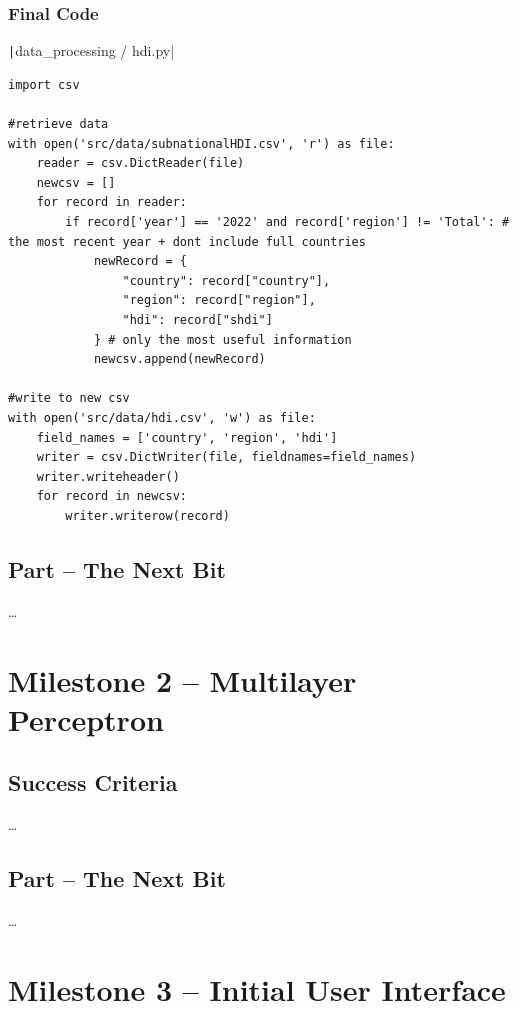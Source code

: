 \documentclass[12pt]{report}
\newcommand{\pil}[1]{\texttt|#1|}
\begin{document}
\subsubsection{Final Code}
\begin{listing}[H]
\pil{data_processing / hdi.py}
\begin{verbatim}
import csv

#retrieve data
with open('src/data/subnationalHDI.csv', 'r') as file:
    reader = csv.DictReader(file)
    newcsv = []
    for record in reader:
        if record['year'] == '2022' and record['region'] != 'Total': # the most recent year + dont include full countries
            newRecord = {
                "country": record["country"],
                "region": record["region"],
                "hdi": record["shdi"]
            } # only the most useful information
            newcsv.append(newRecord)

#write to new csv
with open('src/data/hdi.csv', 'w') as file:
    field_names = ['country', 'region', 'hdi']
    writer = csv.DictWriter(file, fieldnames=field_names)
    writer.writeheader()
    for record in newcsv:
        writer.writerow(record)
\end{verbatim}
\caption{Final HDI Data Processing Code}
\end{listing}

\subsection{Part \theparts{} -- The Next Bit}
\dots

\section{Milestone 2 -- Multilayer Perceptron}
\subsection{Success Criteria}
\dots

\subsection{Part \theparts{} -- The Next Bit}
\dots

\section{Milestone 3 -- Initial User Interface}
\end{document}
